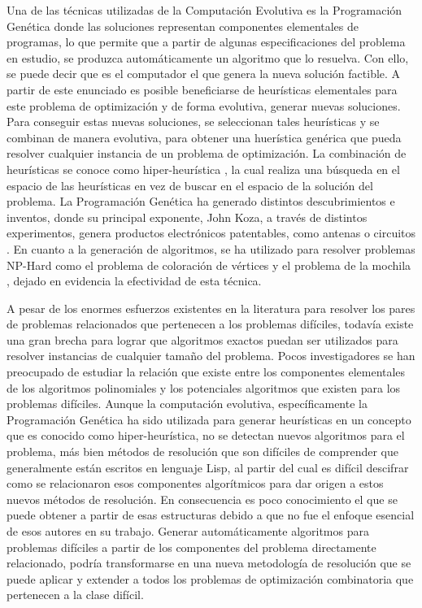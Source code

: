 Una de las técnicas utilizadas de la Computación Evolutiva es la Programación Genética donde las soluciones representan componentes elementales de programas, lo que permite que a partir de algunas especificaciones del problema en estudio, se produzca automáticamente un algoritmo que lo resuelva. Con ello, se puede decir que es el computador el que genera la nueva solución factible. 
A partir de este enunciado es posible beneficiarse de heurísticas elementales para este problema de optimización y de forma evolutiva, generar nuevas soluciones. Para conseguir estas nuevas soluciones, se seleccionan tales heurísticas y se combinan de manera evolutiva, para obtener una huerística genérica que pueda resolver cualquier instancia de un problema de optimización. 
La combinación de heurísticas se conoce como hiper-heurística \citep{burke2010genetic}, la cual realiza una búsqueda en el espacio de las heurísticas en vez de buscar en el espacio de la solución del problema. 
La Programación Genética ha generado distintos descubrimientos e inventos, donde su principal exponente, John Koza, a través de distintos experimentos, genera productos electrónicos patentables, como antenas o circuitos \citep{Koza03}. En cuanto a la generación de algoritmos, se ha utilizado para resolver problemas NP-Hard como el problema de coloración de vértices \citep{bolton2013} y el problema de la mochila \citep{parada_2015}, dejado en evidencia la efectividad de esta técnica. 


A pesar de los enormes esfuerzos existentes en la literatura para resolver los pares de problemas relacionados que pertenecen a los problemas difíciles, todavía existe una gran brecha para lograr que algoritmos exactos puedan ser utilizados para resolver instancias de cualquier tamaño del problema. Pocos investigadores se han preocupado de estudiar la relación que existe entre los componentes elementales de los algoritmos polinomiales  y los potenciales algoritmos que existen para los problemas difíciles. Aunque la computación evolutiva, específicamente la  Programación Genética ha sido utilizada para generar heurísticas en un concepto que es conocido como hiper-heurística, no se detectan nuevos algoritmos para el problema, más bien métodos de resolución que son difíciles de comprender que generalmente están escritos en lenguaje Lisp, al partir del cual es difícil descifrar como se relacionaron esos componentes algorítmicos para dar origen a estos nuevos métodos de resolución. En consecuencia es poco conocimiento el que se puede obtener a partir de esas estructuras debido a que no fue el enfoque esencial de esos autores en su trabajo. Generar automáticamente algoritmos para problemas difíciles a partir de los componentes del problema directamente relacionado, podría transformarse en una nueva metodología de resolución que se puede aplicar y extender a todos los problemas de optimización combinatoria que pertenecen a la clase difícil.


